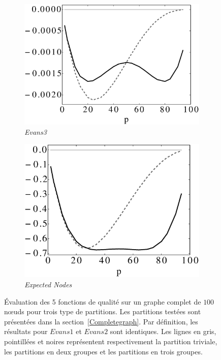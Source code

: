 \begin{figure}[h]
	\vspace*{0.7cm}
	\begin{subfigure}{0.35\linewidth}
		\includegraphics[width=\linewidth]{img/ExpectedNodes/1Clique/Clique_Evans3.eps}
		\caption{\label{fig:1CE3}\emph{Evans3}}		
	\end{subfigure}\hspace*{1cm}
	\begin{subfigure}{0.35\linewidth}
		\includegraphics[width=\linewidth]{img/ExpectedNodes/1Clique/Clique_Expectednode.eps}
		\caption{\label{fig:1CMod}\emph{Expected Nodes}}		
	\end{subfigure}
		
		\caption{\'Evaluation des 5 fonctions de qualité sur un graphe complet de $100$ n\oe{}uds pour trois type de partitions.
		Les partitions testées sont présentées dans la section~\ref{Completegraph}.
		Par définition, les résultats pour $Evans1$ et $Evans2$ sont identiques.
		Les lignes en gris, pointillées et noires représentent respectivement la partition triviale, les partitions en deux groupes et les partitions en trois groupes.}
		\label{fig:1Cres}
\end{figure}

